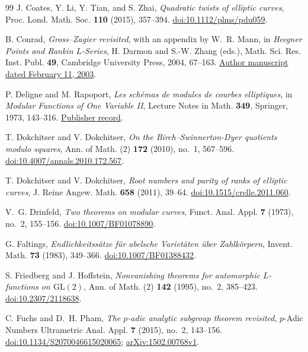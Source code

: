 \begin{thebibliography}{99}
J. Coates, Y. Li, Y. Tian, and S. Zhai,
\emph{Quadratic twists of elliptic curves},
Proc. Lond. Math. Soc. \textbf{110} (2015), 357--394.
\href{https://doi.org/10.1112/plms/pdu059}{doi:10.1112/plms/pdu059}.

B. Conrad,
\emph{Gross--Zagier revisited}, with an appendix by W.~R. Mann,
in \emph{Heegner Points and Rankin $L$-Series},
H. Darmon and S.-W. Zhang (eds.), Math. Sci. Res. Inst. Publ. \textbf{49},
Cambridge University Press, 2004, 67--163.
\href{https://math.stanford.edu/~conrad/papers/gzfinal.pdf}{Author manuscript dated February 11, 2003}.

P. Deligne and M. Rapoport,
\emph{Les sch\'emas de modules de courbes elliptiques},
in \emph{Modular Functions of One Variable II},
Lecture Notes in Math. \textbf{349}, Springer, 1973, 143--316.
\href{https://link.springer.com/book/10.1007/978-3-540-37855-6}{Publisher record}.

T. Dokchitser and V. Dokchitser,
\emph{On the Birch--Swinnerton-Dyer quotients modulo squares},
Ann. of Math. (2) \textbf{172} (2010), no.~1, 567--596.
\href{https://doi.org/10.4007/annals.2010.172.567}{doi:10.4007/annals.2010.172.567}.

T. Dokchitser and V. Dokchitser,
\emph{Root numbers and parity of ranks of elliptic curves},
J. Reine Angew. Math. \textbf{658} (2011), 39--64.
\href{https://doi.org/10.1515/crelle.2011.060}{doi:10.1515/crelle.2011.060}.

V.~G. Drinfeld,
\emph{Two theorems on modular curves},
Funct. Anal. Appl. \textbf{7} (1973), no.~2, 155--156.
\href{https://doi.org/10.1007/BF01078890}{doi:10.1007/BF01078890}.

G. Faltings,
\emph{Endlichkeitss\"atze f\"ur abelsche Variet\"aten \"uber Zahlk\"orpern},
Invent. Math. \textbf{73} (1983), 349--366.
\href{https://doi.org/10.1007/BF01388432}{doi:10.1007/BF01388432}.

S. Friedberg and J. Hoffstein,
\emph{Nonvanishing theorems for automorphic $L$-functions on $\mathrm{GL}(2)$},
Ann. of Math. (2) \textbf{142} (1995), no.~2, 385--423.
\href{https://doi.org/10.2307/2118638}{doi:10.2307/2118638}.

C. Fuchs and D.~H. Pham,
\emph{The $p$-adic analytic subgroup theorem revisited},
$p$-Adic Numbers Ultrametric Anal. Appl. \textbf{7} (2015), no.~2, 143--156.
\href{https://doi.org/10.1134/S2070046615020065}{doi:10.1134/S2070046615020065};
\href{https://arxiv.org/abs/1502.00768v1}{arXiv:1502.00768v1}.


\end{thebibliography}
